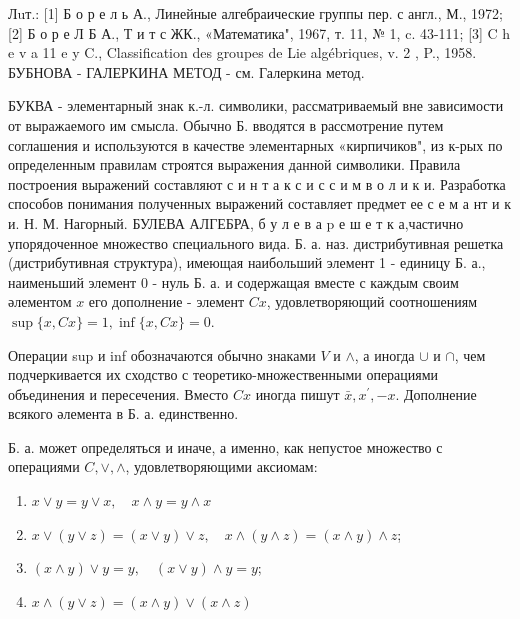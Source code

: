 \documentclass[10pt]{article}
\begin{document}
Лuт.: [1] Б о р е л ь А., Линейные алгебраические группы пер. с англ., М., 1972; [2] Б о р е Л Б А., Т и т с ЖК., «Математика", 1967, т. 11, № 1, c. 43-111; [3] C h e v a 11 e y C., Classification des groupes de Lie algébriques, v. 2 , P., 1958. БУБНОВА - ГАЛЕРКИНА МЕТОД - см. Галеркина метод.



БУКВА - элементарный знак к.-л. символики, рассматриваемый вне зависимости от выражаемого им смысла. Обычно Б. вводятся в рассмотрение путем соглашения и используются в качестве элементарных «кирпичиков", из к-рых по определенным правилам строятся выражения данной символики. Правила построения выражений составляют с и н т а к с и с с и м в о л и к и. Разработка способов понимания полученных выражений составляет предмет ее с е м а нт и к и. Н. М. Нагорный. БУЛЕВА АЛГЕБРА, $б$ у л е в а p е ш е т к а,частично упорядоченное множество специального вида. Б. а. наз. дистрибутивная решетка (дистрибутивная структура), имеющая наибольший элемент 1 - единицу Б. а., наименьший элемент 0 - нуль Б. а. и содержащая вместе с каждым своим әлементом $x$ его дополнение - элемент $C x$, удовлетворяющий соотношениям $\sup \{x, C x\}=1, \inf \{x, C x\}=0$.



Операции sup и inf обозначаются обычно знаками $V$ и $\wedge$, а иногда $\cup$ и $\cap$, чем подчеркивается их сходство с теоретико-множественными операциями объединения и пересечения. Вместо $C x$ иногда пишут $\bar{x}, x^{\prime},-x$. Дополнение всякого әлемента в Б. а. единственно.



Б. а. может определяться и иначе, а именно, как непустое множество с операциями $C, \vee, \wedge$, удовлетворяющими аксиомам:



\begin{enumerate}

  \item $x \vee y=y \vee x, \quad x \wedge y=y \wedge x$



  \item $x \vee(y \vee z)=(x \vee y) \vee z, \quad x \wedge(y \wedge z)=(x \wedge y) \wedge z$;



  \item $(x \wedge y) \vee y=y, \quad(x \vee y) \wedge y=y$;



  \item $x \wedge(y \vee z)=(x \wedge y) \vee(x \wedge z)$



\end{enumerate}
\end{document}
